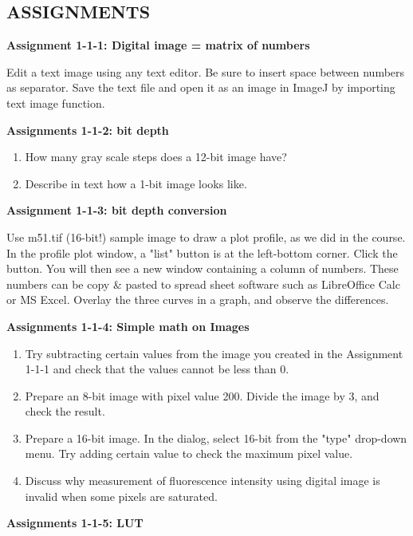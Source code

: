 \clearpage
\subsection{ASSIGNMENTS }%

\textbf{\sffamily
Assignment 1-1-1: Digital image = matrix of numbers}

Edit a text image using any text editor. Be sure to insert space between
numbers as separator. Save the text file and open it as an image in
ImageJ by importing text image function. \ \ 

\textbf{\sffamily
Assignments 1-1-2: bit depth}
\begin{enumerate}
\item How many gray scale steps does a 12-bit image have?\\
\item Describe in text how a 1-bit image looks like.
\end{enumerate}

\textbf{\sffamily
Assignment 1-1-3: bit depth conversion}

Use m51.tif (16-bit!) sample image to draw a plot profile, as we did in
the course. In the profile plot window, a
"list" button is at the left-bottom corner.
Click the button. You will then see a new window containing a column of
numbers. These numbers can be copy \& pasted to spread sheet software
such as LibreOffice Calc or MS Excel. Overlay the three curves in a graph,
and observe the differences. 

\textbf{\sffamily
Assignments 1-1-4: Simple math on Images}
\begin{enumerate}
\item Try subtracting certain values from the image you created in
the Assignment 1-1-1 and check that the values cannot be less than 0. 
\item Prepare an 8-bit image with pixel value 200. Divide the
image by 3, and check the result. 

\item Prepare a 16-bit image. In the  dialog, select 16-bit from the
"type" drop-down menu. Try adding
certain value to check the maximum pixel value. 

\item Discuss why measurement of fluorescence intensity using
digital image is invalid when some pixels are saturated. 
\end{enumerate}

\textbf{\sffamily
Assignments 1-1-5: LUT}

